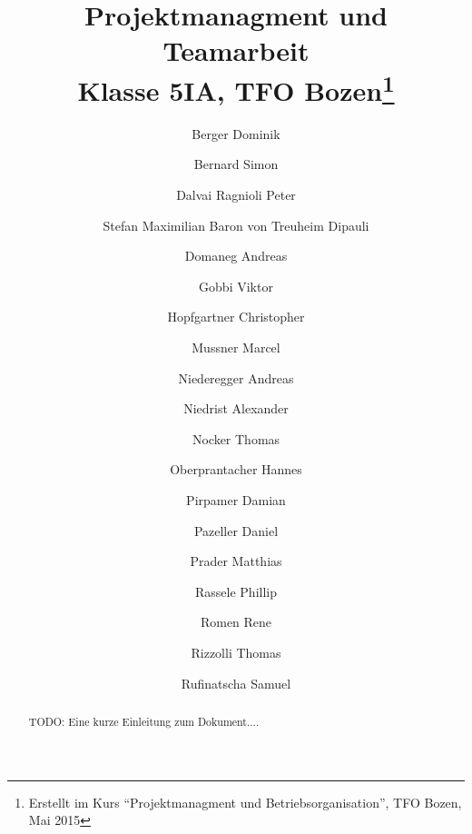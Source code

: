 \documentclass{article}
\title{Projektmanagment und Teamarbeit\\Klasse 5IA, TFO Bozen\thanks{Erstellt 
im Kurs ``Projektmanagment und Betriebsorganisation'', TFO Bozen, Mai 2015}}
\author{Berger Dominik
\and Bernard Simon
\and Dalvai Ragnioli Peter
\and Stefan Maximilian Baron von Treuheim Dipauli
\and Domaneg Andreas
\and Gobbi Viktor
\and Hopfgartner Christopher
\and Mussner Marcel
\and Niederegger Andreas
\and Niedrist Alexander
\and Nocker Thomas
\and Oberprantacher Hannes
\and Pirpamer Damian
\and Pazeller Daniel
\and Prader Matthias
\and Rassele Phillip
\and Romen Rene
\and Rizzolli Thomas
\and Rufinatscha Samuel}
\begin{document}
\maketitle


\begin{abstract}
 TODO: Eine kurze Einleitung zum Dokument....
\end{abstract}

\newpage


\begin{sloppypar}
\tableofcontents
\listoffigures






















\end{sloppypar}
\end{document}
